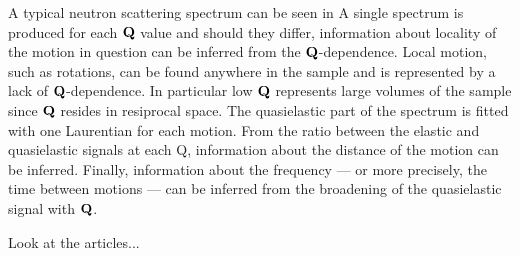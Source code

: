 
A typical neutron scattering spectrum can be seen in 
A single spectrum is produced for each ${\mathrm{\mathbf{\bm{Q}}}}$ value and should they differ, information about locality of the motion in question can be inferred from the ${\mathrm{\mathbf{\bm{Q}}}}$-dependence.
Local motion, such as rotations, can be found anywhere in the sample and is represented by a lack of ${\mathrm{\mathbf{\bm{Q}}}}$-dependence.
In particular low ${\mathrm{\mathbf{\bm{Q}}}}$ represents large volumes of the sample since ${\mathrm{\mathbf{\bm{Q}}}}$ resides in resiprocal space.
The quasielastic part of the spectrum is fitted with one Laurentian for each motion.
From the ratio between the elastic and quasielastic signals at each Q, information about the distance of the motion can be inferred.
Finally, information about the frequency --- or more precisely, the time between motions --- can be inferred from the broadening of the quasielastic signal with ${\mathrm{\mathbf{\bm{Q}}}}$.

\bit
\item Look at the articles...
\eit


\incomplete
